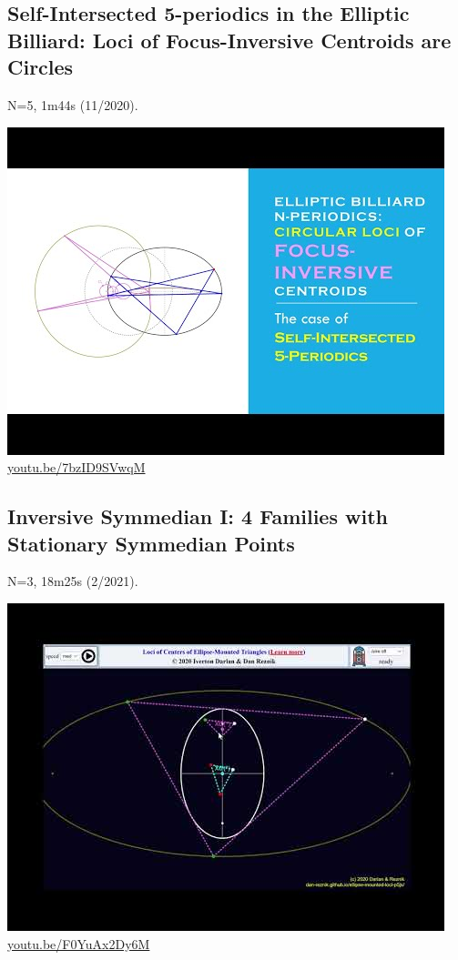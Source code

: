 \documentclass[12pt]{amsart}
\begin{document}
\subsection{Self-Intersected 5-periodics in the Elliptic Billiard: Loci of Focus-Inversive Centroids are Circles}
\label{vid:7bzID9SVwqM}
\noindent N=5, 1m44s (11/2020). 
\begin{center}\includegraphics[width=.5\textwidth]{pics/7bzID9SVwqM.jpg} \\ 
\href{https://youtu.be/7bzID9SVwqM}{\url{youtu.be/7bzID9SVwqM}}\end{center}
% 

\subsection{Inversive Symmedian I: 4 Families with Stationary Symmedian Points}
\label{vid:F0YuAx2Dy6M}
\noindent N=3, 18m25s (2/2021). 
\begin{center}\includegraphics[width=.5\textwidth]{pics/F0YuAx2Dy6M.jpg} \\ 
\href{https://youtu.be/F0YuAx2Dy6M}{\url{youtu.be/F0YuAx2Dy6M}}\end{center}
% 
\end{document}
